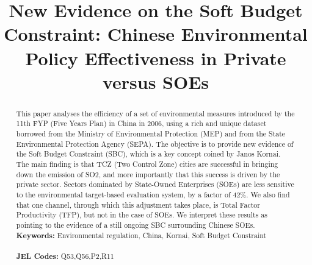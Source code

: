 \documentclass[12pt]{article}
\begin{document}
\begin{titlepage}


\title{New Evidence on the Soft Budget Constraint: Chinese Environmental Policy Effectiveness in Private versus SOEs}
\author{
}


\date{}

\maketitle
\begin{abstract}
\noindent This paper analyses the efficiency of a set of environmental measures introduced by the 11th FYP (Five Years Plan) in China in 2006, using a rich and unique dataset borrowed from the Ministry of Environmental Protection (MEP) and from the State Environmental Protection Agency (SEPA). The objective is to provide new evidence of the Soft Budget Constraint (SBC), which is a key concept coined by Janos Kornai. The main finding is that TCZ (Two Control Zone) cities are successful in bringing down the emission of SO2, and more importantly that this success is driven by the private sector. Sectors dominated by State-Owned Enterprises (SOEs) are less sensitive to the environmental target-based evaluation system, by a factor of 42\%. We also find that one channel, through which this adjustment takes place, is Total Factor Productivity (TFP), but not in the case of SOEs. We interpret these results as pointing to the evidence of a still ongoing SBC surrounding Chinese SOEs.  
\vspace{0em}\\
\noindent\textbf{Keywords:} Environmental regulation, China, Kornai, Soft Budget Constraint\\
\vspace{0em}\\
\noindent\textbf{JEL Codes:} Q53,Q56,P2,R11
\\

\bigskip
\end{abstract}
\setcounter{page}{0}
\thispagestyle{empty}
\end{titlepage}
\end{document}
